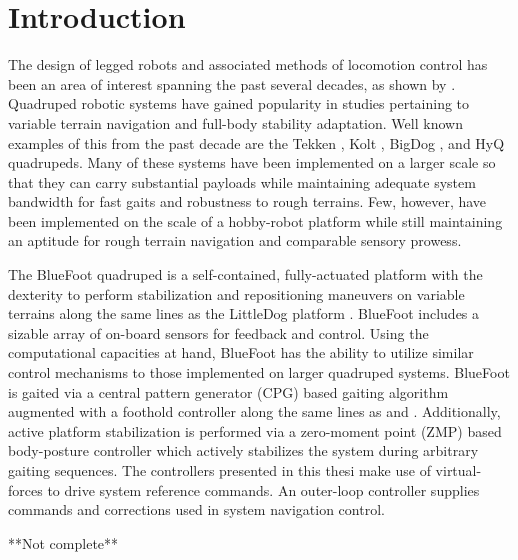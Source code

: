 \chapter{Introduction}
		The design of legged robots and associated methods of locomotion control has been an area of interest spanning the past several decades, as shown by		
		\cite{
		McGhee1965,
		Hodgins1991, 
		Altendorfer2001, 
		Kolter2008
		}.
		Quadruped robotic systems have gained popularity in studies pertaining to variable terrain navigation and full-body stability adaptation. Well known examples of this from the past decade are the Tekken \cite{Fukuoka2003}, Kolt \cite{Estremera2006}, BigDog \cite{BigDog2008}, and HyQ \cite{Semini2010_PHD} quadrupeds. Many of these systems have been implemented on a larger scale so that they can carry substantial payloads while maintaining adequate system bandwidth for fast gaits and robustness to rough terrains. Few, however, have been implemented on the scale of a hobby-robot platform while still maintaining an aptitude for rough terrain navigation and comparable sensory prowess.

		The BlueFoot quadruped is a self-contained, fully-actuated platform with the dexterity to perform stabilization and  repositioning maneuvers on variable terrains along the same lines as the LittleDog platform \cite{Rebula2007}. BlueFoot includes a sizable array of on-board sensors for feedback and control. Using the computational capacities at hand, BlueFoot has the ability to utilize similar control mechanisms to those implemented on larger quadruped systems. BlueFoot is  gaited via a central pattern generator (CPG) based gaiting algorithm augmented with a foothold controller along the same lines as \cite{Ajallooeian2013} and \cite{Rutishauser2008}. Additionally, active platform stabilization is performed via a zero-moment point (ZMP) based body-posture controller which actively stabilizes the system during arbitrary gaiting sequences. The controllers presented in this thesi make use of virtual-forces to drive system reference commands. An outer-loop controller supplies commands and corrections used in system navigation control.

**Not complete**
